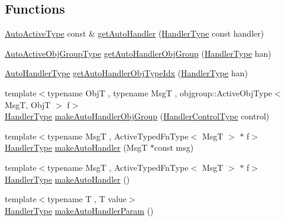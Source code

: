 \subsection*{Functions}
\begin{DoxyCompactItemize}
\item 
\hyperlink{namespacevt_1_1auto__registry_a2c91a60d4d3c0d80a563c3d4f54162eb}{Auto\+Active\+Type} const  \& \hyperlink{namespacevt_1_1auto__registry_a94926420bd6db07e6c1ae51ab0b06227}{get\+Auto\+Handler} (\hyperlink{namespacevt_af64846b57dfcaf104da3ef6967917573}{Handler\+Type} const handler)
\item 
\hyperlink{namespacevt_1_1auto__registry_a861d9d01e89c81f0a955188724aa25b3}{Auto\+Active\+Obj\+Group\+Type} \hyperlink{namespacevt_1_1auto__registry_a097c75f223a97888d8157568b6ea9bd1}{get\+Auto\+Handler\+Obj\+Group} (\hyperlink{namespacevt_af64846b57dfcaf104da3ef6967917573}{Handler\+Type} han)
\item 
\hyperlink{namespacevt_1_1auto__registry_ae295e18699146815bb7d7674594d95d7}{Auto\+Handler\+Type} \hyperlink{namespacevt_1_1auto__registry_a0c47caf1e4978208704029c0d0f925f0}{get\+Auto\+Handler\+Obj\+Type\+Idx} (\hyperlink{namespacevt_af64846b57dfcaf104da3ef6967917573}{Handler\+Type} han)
\item 
{\footnotesize template$<$typename ObjT , typename MsgT , objgroup\+::\+Active\+Obj\+Type$<$ Msg\+T, Obj\+T $>$ f$>$ }\\\hyperlink{namespacevt_af64846b57dfcaf104da3ef6967917573}{Handler\+Type} \hyperlink{namespacevt_1_1auto__registry_af096c71af57c441be5d6d5f9c1dd52fd}{make\+Auto\+Handler\+Obj\+Group} (\hyperlink{namespacevt_adbbef13b92f0a93b14c219b7cc8a48f2}{Handler\+Control\+Type} control)
\item 
{\footnotesize template$<$typename MsgT , Active\+Typed\+Fn\+Type$<$ Msg\+T $>$ $\ast$ f$>$ }\\\hyperlink{namespacevt_af64846b57dfcaf104da3ef6967917573}{Handler\+Type} \hyperlink{namespacevt_1_1auto__registry_abac49a5da9edd265913ca474a6624a09}{make\+Auto\+Handler} (MsgT $\ast$const msg)
\item 
{\footnotesize template$<$typename MsgT , Active\+Typed\+Fn\+Type$<$ Msg\+T $>$ $\ast$ f$>$ }\\\hyperlink{namespacevt_af64846b57dfcaf104da3ef6967917573}{Handler\+Type} \hyperlink{namespacevt_1_1auto__registry_a965b4801e4d0aee0e5b86342c92baf68}{make\+Auto\+Handler} ()
\item 
{\footnotesize template$<$typename T , T value$>$ }\\\hyperlink{namespacevt_af64846b57dfcaf104da3ef6967917573}{Handler\+Type} \hyperlink{namespacevt_1_1auto__registry_a5253f6bb76b4c7e98416fddd05c2695e}{make\+Auto\+Handler\+Param} ()

\end{DoxyCompactItemize}
